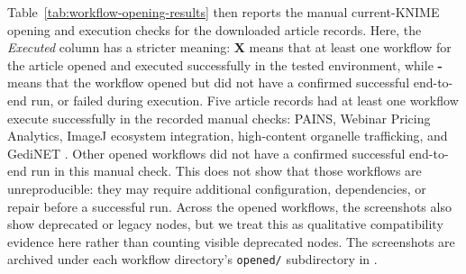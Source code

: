 \documentclass[runningheads]{llncs}
\begin{document}
Table~\ref{tab:workflow-opening-results} then reports the manual current-KNIME
opening and execution checks for the downloaded article records. Here, the
\emph{Executed} column has a stricter meaning: \textbf{X} means that at least
one workflow for the article opened and executed successfully in the tested
environment, while \textbf{-} means that the workflow opened but did not have a
confirmed successful end-to-end run, or failed during execution. Five article
records had at least one workflow execute successfully in the recorded manual
checks: PAINS, Webinar Pricing Analytics, ImageJ ecosystem integration,
high-content organelle trafficking, and GediNET
\cite{Saubern2011PAINS,VillarroelOrdenes2021KNIMEHub,Dietz2020ImageJKNIME,Pal2018OrganelleKNIME,Qumsiyeh2022GediNET}.
Other opened workflows did not have a confirmed successful end-to-end run in
this manual check. This does not show that those workflows are unreproducible:
they may require additional configuration, dependencies, or repair before a
successful run. Across the opened workflows, the screenshots also show
deprecated or legacy nodes, but we treat this as qualitative compatibility
evidence here rather than counting visible deprecated nodes. The screenshots
are archived under each workflow directory's \texttt{opened/} subdirectory in
.
\end{document}
